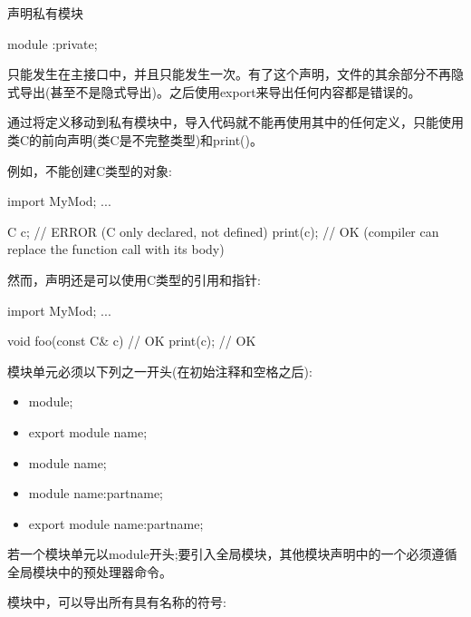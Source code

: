 声明私有模块

\begin{cpp}
module :private;
\end{cpp}

只能发生在主接口中，并且只能发生一次。有了这个声明，文件的其余部分不再隐式导出(甚至不是隐式导出)。之后使用export来导出任何内容都是错误的。

通过将定义移动到私有模块中，导入代码就不能再使用其中的任何定义，只能使用类C的前向声明(类C是不完整类型)和print()。

例如，不能创建C类型的对象:

\begin{cpp}
import MyMod;
...

C c; // ERROR (C only declared, not defined)
print(c); // OK (compiler can replace the function call with its body)
\end{cpp}

然而，声明还是可以使用C类型的引用和指针:

\begin{cpp}
import MyMod;
...

void foo(const C& c) { // OK
	print(c); // OK
}
\end{cpp}


模块单元必须以下列之一开头(在初始注释和空格之后):

\begin{itemize}
\item 
module;

\item 
export module name;

\item 
module name;

\item 
module name:partname;

\item 
export module name:partname;
\end{itemize}

若一个模块单元以module开头;要引入全局模块，其他模块声明中的一个必须遵循全局模块中的预处理器命令。

模块中，可以导出所有具有名称的符号:

